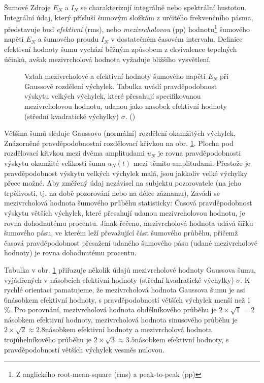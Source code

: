         Šumové Zdroje \(E_N\) a \(I_N\) se charakterizují integrálně nebo spektrální hustotou.
        Integrální údaj, který přísluší šumovým složkám z určitého frekvenčního pásma, představuje buď
        \emph{efektivní} (rms), nebo \emph{mezivrcholovou} (pp) hodnotu\footnote{Z anglického
        root-mean-square (rms) a peak-to-peak (pp)} šumového napětí \(E_N\) a šumového proudu \(I_N\)
        v dostatečném časovém intervalu. Definice efektivní hodnoty šumu vychází běžným způsobem z
        ekvivalence tepelných účinků, avšak mezivrcholová hodnota vyžaduje bližšího vysvětlení.

        \begin{figure}[ht!] %
          \centering
          \caption{Vztah mezivrcholové a efektivní hodnoty šumového napětí \(E_N\) při Gaussově
                  rozdělení výchylek. Tabulka uvádí pravděpodobnost výskytu velkých výchylek, které
                  přesahují specifikovanou mezivrcholovou hodnotu, udanou jako nasobek efektivní
                  hodnoty (střední kvadratické výchylky) \(\sigma\). (\cite[s.~20]{Dostal})}
          \label{aes:fig050}
        \end{figure}

        Většina šumů sleduje Gaussovo (normální) rozdělení okamžitých výchylek, Znázorněné
        pravděpodobnostní rozdělovací křivkou na obr. \ref{aes:fig050}. Plocha pod rozdělovací křivkou
        mezi dvěma amplitudami \(u_N\) je rovna pravděpodobnosti výskytu okamžité velikosti šumu
        \(u_N(t)\) mezi těmito amplitudami. Přestože je pravděpodobnost výskytu velkých výchylek malá,
        jsou jakkoliv velké výchylky přece možné. Aby změřený údaj nezávisel na subjektu pozorovatele
        (na jeho trpělivosti, tj. na době pozorování nebo na délce záznamu), Zavádí se mezivrcholová
        hodnota šumového průběhu statisticky: Časová pravděpodobnost výskytu větších výchylek, které
        přesahují udanou mezivrcholovou hodnotu, je rovna dohodnutému procentu. Jinak řečeno,
        mezivrcholová hodnota udává šířku šumového pásu, ve kterém leží převažující část šumového
        průběhu, přičemž časová pravděpodobnost přesažení udaného šumového pásu (udané mezivrcholové
        hodnoty) je rovna dohodnutému procentu.

        Tabulka v obr. \ref{aes:fig050} přiřazuje několik údajů mezivrcholové hodnoty Gaussova šumu,
        vyjádřených v násobcích efektivní hodnoty (střední kvadratické výchylky) \(\sigma\). K rychlé
        orientaci pamatujeme, že mezivrcholová hodnota Gaussova šumu je asi \num{6}násobkem efektivní
        hodnoty, s pravděpodobností větších výchylek menší než 1 \%. Pro porovnání, mezivrcholová
        hodnota obdélníkového průběhu je \(2\times\sqrt{1} =2\)násobkem efektivní hodnoty,
        mezivrcholová hodnota sinusového průběhu je \(2\times\sqrt{2}\approx\num{2.8}\)násobkem
        efektivní hodnoty a mezivrcholová hodnota trojúhelníkového průběhu je
        \(2\times\sqrt{3}\approx\num{3.5}\)násobkem efektivní hodnoty, s pravděpodobností větších
        výchylek vesměs nulovou.
        
